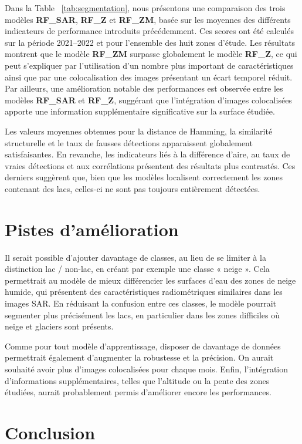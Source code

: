 \documentclass[11pt,a4paper]{article}
\begin{document}
Dans la Table ~\ref{tab:segmentation}, nous présentons une comparaison des trois modèles \textbf{RF\_SAR}, \textbf{RF\_Z} et \textbf{RF\_ZM}, basée sur les moyennes des différents indicateurs de performance introduits précédemment. Ces scores ont été calculés sur la période 2021–2022 et pour l’ensemble des huit zones d’étude. Les résultats montrent que le modèle \textbf{RF\_ZM} surpasse globalement le modèle \textbf{RF\_Z}, ce qui peut s’expliquer par l’utilisation d’un nombre plus important de caractéristiques ainsi que par une colocalisation des images présentant un écart temporel réduit. Par ailleurs, une amélioration notable des performances est observée entre les modèles \textbf{RF\_SAR} et \textbf{RF\_Z}, suggérant que l’intégration d’images colocalisées apporte une information supplémentaire significative sur la surface étudiée.

Les valeurs moyennes obtenues pour la distance de Hamming, la similarité structurelle et le taux de fausses détections apparaissent globalement satisfaisantes. En revanche, les indicateurs liés à la différence d’aire, au taux de vraies détections et aux corrélations présentent des résultats plus contrastés. Ces derniers suggèrent que, bien que les modèles localisent correctement les zones contenant des lacs, celles-ci ne sont pas toujours entièrement détectées.

\section{Pistes d’amélioration}

Il serait possible d'ajouter davantage de classes, au lieu de se limiter à la distinction lac / non-lac, en créant par exemple une classe « neige ». Cela permettrait au modèle de mieux différencier les surfaces d’eau des zones de neige humide, qui présentent des caractéristiques radiométriques similaires dans les images SAR. En réduisant la confusion entre ces classes, le modèle pourrait segmenter plus précisément les lacs, en particulier dans les zones difficiles où neige et glaciers sont présents.

Comme pour tout modèle d’apprentissage, disposer de davantage de données permettrait également d’augmenter la robustesse et la précision. On aurait souhaité avoir plus d’images colocalisées pour chaque mois. Enfin, l’intégration d’informations supplémentaires, telles que l’altitude ou la pente des zones étudiées, aurait probablement permis d’améliorer encore les performances.

\section{Conclusion}

  
\clearpage
{} %
\end{document}
